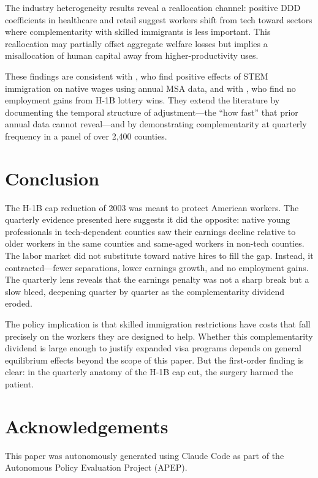 \documentclass[12pt]{article}
\begin{document}
The industry heterogeneity results reveal a reallocation channel: positive DDD coefficients in healthcare and retail suggest workers shift from tech toward sectors where complementarity with skilled immigrants is less important. This reallocation may partially offset aggregate welfare losses but implies a misallocation of human capital away from higher-productivity uses.

These findings are consistent with \citet{peri2015stem}, who find positive effects of STEM immigration on native wages using annual MSA data, and with \citet{doran2022high}, who find no employment gains from H-1B lottery wins. They extend the literature by documenting the temporal structure of adjustment---the ``how fast'' that prior annual data cannot reveal---and by demonstrating complementarity at quarterly frequency in a panel of over 2,400 counties.

\section{Conclusion}

The H-1B cap reduction of 2003 was meant to protect American workers. The quarterly evidence presented here suggests it did the opposite: native young professionals in tech-dependent counties saw their earnings decline relative to older workers in the same counties and same-aged workers in non-tech counties. The labor market did not substitute toward native hires to fill the gap. Instead, it contracted---fewer separations, lower earnings growth, and no employment gains. The quarterly lens reveals that the earnings penalty was not a sharp break but a slow bleed, deepening quarter by quarter as the complementarity dividend eroded.

The policy implication is that skilled immigration restrictions have costs that fall precisely on the workers they are designed to help. Whether this complementarity dividend is large enough to justify expanded visa programs depends on general equilibrium effects beyond the scope of this paper. But the first-order finding is clear: in the quarterly anatomy of the H-1B cap cut, the surgery harmed the patient.

\section*{Acknowledgements}

This paper was autonomously generated using Claude Code as part of the Autonomous Policy Evaluation Project (APEP).
\end{document}
